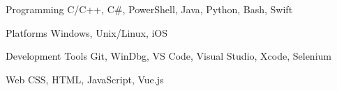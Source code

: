 
\begin{cvskills}

  \cvskill
    {Programming} %
    {C/C++, C\#, PowerShell, Java, Python, Bash, Swift} %

  \cvskill
    {Platforms} %
    {Windows, Unix/Linux, iOS} %

  \cvskill
    {Development Tools} %
    {Git, WinDbg, VS Code, Visual Studio, Xcode, Selenium} %

  \cvskill
    {Web} %
    {CSS, HTML, JavaScript, Vue.js} %

\end{cvskills}
